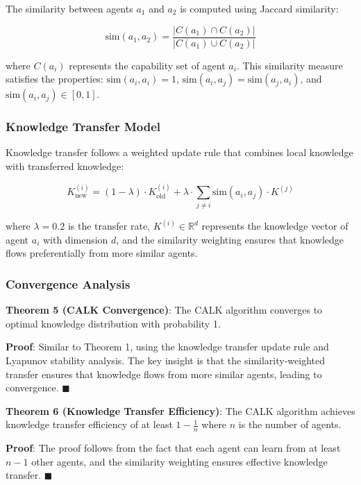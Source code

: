\documentclass[conference]{IEEEtran}
\begin{document}
The similarity between agents $a_1$ and $a_2$ is computed using Jaccard similarity:

\begin{equation}
\text{sim}(a_1, a_2) = \frac{|C(a_1) \cap C(a_2)|}{|C(a_1) \cup C(a_2)|}
\end{equation}

where $C(a_i)$ represents the capability set of agent $a_i$. This similarity measure satisfies the properties: $\text{sim}(a_i, a_i) = 1$, $\text{sim}(a_i, a_j) = \text{sim}(a_j, a_i)$, and $\text{sim}(a_i, a_j) \in [0,1]$.

\subsubsection{Knowledge Transfer Model}

Knowledge transfer follows a weighted update rule that combines local knowledge with transferred knowledge:

\begin{equation}
K_{\text{new}}^{(i)} = (1-\lambda) \cdot K_{\text{old}}^{(i)} + \lambda \cdot \sum_{j \neq i} \text{sim}(a_i, a_j) \cdot K^{(j)}
\end{equation}

where $\lambda = 0.2$ is the transfer rate, $K^{(i)} \in \mathbb{R}^d$ represents the knowledge vector of agent $a_i$ with dimension $d$, and the similarity weighting ensures that knowledge flows preferentially from more similar agents.

\subsubsection{Convergence Analysis}

\textbf{Theorem 5 (CALK Convergence)}: The CALK algorithm converges to optimal knowledge distribution with probability 1.

\textbf{Proof}: Similar to Theorem 1, using the knowledge transfer update rule and Lyapunov stability analysis. The key insight is that the similarity-weighted transfer ensures that knowledge flows from more similar agents, leading to convergence. $\blacksquare$

\textbf{Theorem 6 (Knowledge Transfer Efficiency)}: The CALK algorithm achieves knowledge transfer efficiency of at least $1 - \frac{1}{n}$ where $n$ is the number of agents.

\textbf{Proof}: The proof follows from the fact that each agent can learn from at least $n-1$ other agents, and the similarity weighting ensures effective knowledge transfer. $\blacksquare$
\end{document}
